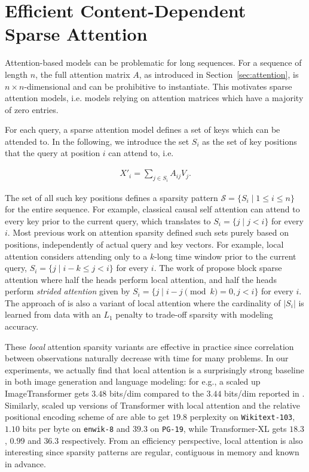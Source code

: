 \section{Efficient Content-Dependent Sparse Attention}\label{sec:ksparse}
Attention-based models can be problematic for long sequences. For a sequence of length $n$, the full attention matrix $A$, as introduced in Section~\ref{sec:attention}, 
is \(n \times n\)-dimensional and can be prohibitive to instantiate. This motivates sparse attention models, i.e. models relying on attention matrices which have a majority of zero entries. 

For each query, a sparse attention model defines a set of keys which can be attended to. In the following, we introduce the set $S_i$ as the set of key positions that the query at position $i$ can attend to, i.e.

\begin{align}
X'_i = 
    \sum_{j \in S_i} A_{ij} V_j.
\end{align}

The set of all such key positions defines a sparsity pattern \(\mathcal{S} = \{S_i \mid 1 \le i \le n\}\) for the entire sequence. For example, classical causal self attention can attend to every key prior to the current query, which translates to $S_i = \{ j \mid j < i\}$ for every \(i\).
Most previous work on attention sparsity defined such sets purely based on positions, independently of actual query and key vectors. For example, local attention \citep{luong2015effective} considers attending only to a $k$-long time window prior to the current query, 
\(S_i = \{j \mid i - k \le j < i\}\) for every \(i\). 
The work of \citet{child2019generating} propose block sparse attention where half the heads perform local attention, and half the heads perform \emph{strided attention} given by \(S_i = \{j \mid i - j \pmod k = 0, j < i\}\)
for every \(i\). 
The approach of \citet{sukhbaatar2019adaptive} is also a variant of local attention where the cardinality of $|S_i|$ is learned from data with an $L_1$ penalty to trade-off sparsity with modeling accuracy.

These \emph{local} attention sparsity variants are effective in practice since correlation between observations naturally decrease with time for many problems. In our experiments, we actually find that local attention is a surprisingly strong baseline in both image generation and language modeling: for e.g., a scaled up ImageTransformer \citep{parmar2018image}  gets \(3.48\) bits/dim compared to the \(3.44\) bits/dim reported in \citet{child2019generating}.
Similarly, scaled up versions of Transformer with local attention and the relative positional encoding scheme of \citet{shaw2018self} are able to get \(19.8\) perplexity on 
\texttt{Wikitext-103}, \(1.10\) bits per byte on \texttt{enwik-8} and \(39.3\) on \texttt{PG-19},
while Transformer-XL \citep{dai2019transformer} gets \(18.3\), \(0.99\) and \(36.3\) respectively. From an efficiency perspective, local attention is also interesting since sparsity patterns are regular, contiguous in memory and known in advance.

